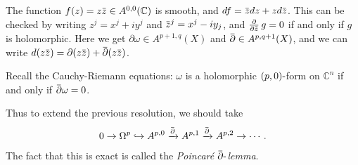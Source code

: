 \begin{example}[?]

The function
\(f(z) = z\mkern 1.5mu\overline{\mkern-1.5muz\mkern-1.5mu}\mkern 1.5mu \in A^{0, 0}({\mathbb{C}})\)
is smooth, and
\(df = \mkern 1.5mu\overline{\mkern-1.5muz\mkern-1.5mu}\mkern 1.5mu dz + z d\mkern 1.5mu\overline{\mkern-1.5muz\mkern-1.5mu}\mkern 1.5mu\).
This can be checked by writing \(z^j = x^j + iy^j\) and
\(\mkern 1.5mu\overline{\mkern-1.5muz\mkern-1.5mu}\mkern 1.5mu^j = x^j - iy_j\),
and
\({\frac{\partial }{\partial \mkern 1.5mu\overline{\mkern-1.5muz\mkern-1.5mu}\mkern 1.5mu}\,} g = 0\)
if and only if \(g\) is holomorphic. Here we get
\({\partial}\omega \in A^{p+1, q}(X)\) and
\(\mkern 1.5mu\overline{\mkern-1.5mu{\partial}\mkern-1.5mu}\mkern 1.5mu \in A^{p, q+1}(X)\),
and we can write
\(d(z \mkern 1.5mu\overline{\mkern-1.5muz\mkern-1.5mu}\mkern 1.5mu) = {\partial}(z\mkern 1.5mu\overline{\mkern-1.5muz\mkern-1.5mu}\mkern 1.5mu) + \mkern 1.5mu\overline{\mkern-1.5mu{\partial}\mkern-1.5mu}\mkern 1.5mu(z\mkern 1.5mu\overline{\mkern-1.5muz\mkern-1.5mu}\mkern 1.5mu)\).

\end{example}

\begin{definition}

Recall the Cauchy-Riemann equations: \(\omega\) is a holomorphic
\((p, 0) {\hbox{-}}\)form on \({\mathbb{C}}^n\) if and only if
\(\mkern 1.5mu\overline{\mkern-1.5mu{\partial}\mkern-1.5mu}\mkern 1.5mu\omega = 0\).

\end{definition}

\begin{remark}

Thus to extend the previous resolution, we should take
\begin{align*}
0 \to \Omega^p \hookrightarrow A^{p, 0} \xrightarrow{\mkern 1.5mu\overline{\mkern-1.5mu{\partial}\mkern-1.5mu}\mkern 1.5mu} A^{p, 1} \xrightarrow{\mkern 1.5mu\overline{\mkern-1.5mu{\partial}\mkern-1.5mu}\mkern 1.5mu} A^{p, 2} \to \cdots
.\end{align*}
The fact that this is exact is called the \emph{Poincaré
\(\mkern 1.5mu\overline{\mkern-1.5mu{\partial}\mkern-1.5mu}\mkern 1.5mu{\hbox{-}}\)lemma}.

\end{remark}

